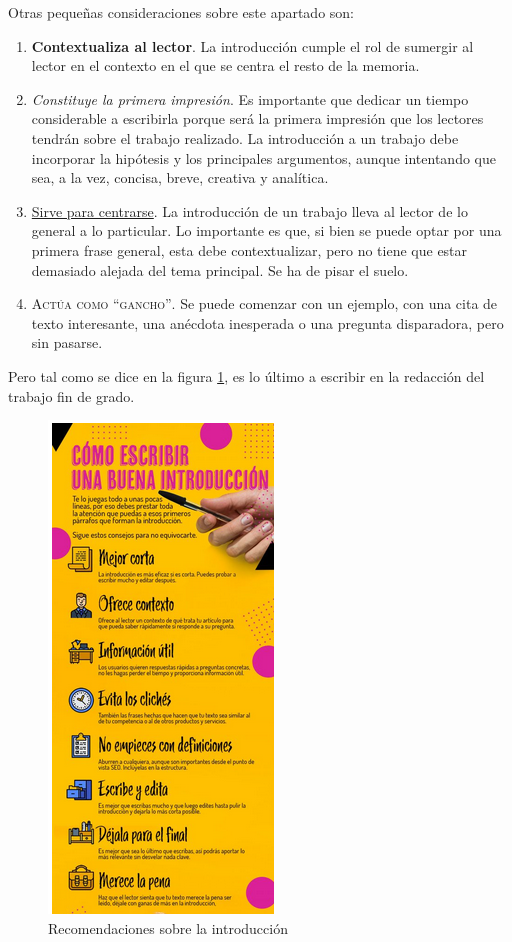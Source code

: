 Otras pequeñas consideraciones sobre este apartado son:
\begin{enumerate}
    \item  \textbf{Contextualiza al lector}. La introducción cumple el rol de sumergir al lector en el contexto en el que se  centra el resto de la memoria.
    \item  \textit{Constituye la primera impresión}. Es importante que dedicar un tiempo considerable a escribirla porque será la primera impresión que los lectores tendrán sobre el trabajo realizado. La introducción a un trabajo debe incorporar la hipótesis y los principales argumentos, aunque intentando que sea, a la vez, concisa, breve, creativa y analítica.

\item \underline{ Sirve para centrarse}. La introducción de un trabajo lleva al lector de lo general a lo particular. Lo importante es que, si bien se puede optar por una primera frase general, esta debe contextualizar, pero no tiene que estar demasiado alejada del tema principal. Se ha de pisar el suelo.

\item \textsc{Actúa como “gancho”}.  Se puede comenzar con un ejemplo, con una cita de texto interesante, una anécdota inesperada o una pregunta disparadora, pero sin pasarse.
    
\end{enumerate}


Pero  tal como se dice en la figura \ref{fig:recintro}, es lo último a escribir en la redacción del  trabajo fin de grado.


\begin{figure}
	\begin{center}
		\includegraphics[scale = 0.95]{Figuras/intro.png}
	\end{center}
	\caption{\label{fig:recintro} Recomendaciones sobre la introducción}
\end{figure}



